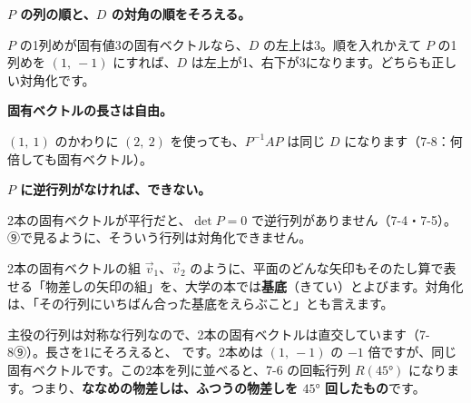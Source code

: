 \begin{enumerate}[label={\bkcircled[\bkTT]{\arabic*}}, leftmargin=2.4\zw, itemsep=2pt, topsep=2pt]
\item \textbf{$P$ の列の順と、$D$ の対角の順をそろえる。}\par\nobreak\noindent $P$ の1列めが固有値3の固有ベクトルなら、$D$ の左上は3。順を入れかえて $P$ の1列めを $(1,\ -1)$ にすれば、$D$ は左上が1、右下が3になります。どちらも正しい対角化です。
\item \textbf{固有ベクトルの長さは自由。}\par\nobreak\noindent $(1,\ 1)$ のかわりに $(2,\ 2)$ を使っても、$P^{-1}AP$ は同じ $D$ になります（7-8：何倍しても固有ベクトル）。
\item \textbf{$P$ に逆行列がなければ、できない。}\par\nobreak\noindent 2本の固有ベクトルが平行だと、$\det P=0$ で逆行列がありません（7-4・7-5）。⑨で見るように、そういう行列は対角化できません。
\end{enumerate}

2本の固有ベクトルの組 $\vec v_1$、$\vec v_2$ のように、平面のどんな矢印もそのたし算で表せる「物差しの矢印の組」を、大学の本では\textbf{基底}（きてい）とよびます。対角化は、「その行列にいちばん合った基底をえらぶこと」とも言えます。


\label{bk:7-9:kaiten}主役の行列は対称な行列なので、2本の固有ベクトルは直交しています（7-8⑨）。長さを1にそろえると、
です。2本めは $(1,\ -1)$ の $-1$ 倍ですが、同じ固有ベクトルです。この2本を列に並べると、7-6 の回転行列 $R(45°)$ になります。つまり、\textbf{ななめの物差しは、ふつうの物差しを $45°$ 回したもの}です。

